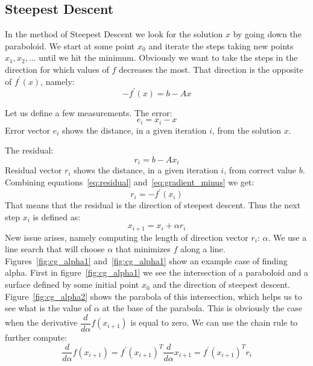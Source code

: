 \documentclass[en]{minipw} %
\begin{document}
\subsection{Steepest Descent}
In the method of Steepest Descent we look for the solution $x$ by going down the paraboloid. We start at some point $x_0$ and iterate the steps taking new points $x_1, x_2 ,...$ until we hit the minimum. Obviously we want to take the steps in the direction for which values of $f$ decreases the most. That direction is the opposite of $f^{'}(x)$, namely:
\begin{equation}
\label{eq:gradient_minus}
-f^{'}(x) = b - Ax
\end{equation}

Let us define a few measurements. The error:
\begin{equation}
e_i = x_i - x
\end{equation}
Error vector $e_i$ shows the distance, in a given iteration $i$, from the solution $x$.

The residual:
\begin{equation}
\label{eq:residual}
r_i = b - Ax_i
\end{equation}
Residual vector $r_i$ shows the distance, in a given iteration $i$, from correct value $b$.
Combining equations~\ref{eq:residual} and~\ref{eq:gradient_minus} we get:
\begin{equation}
r_i = -f^{'}(x_i)
\end{equation}
That means that the residual is the direction of steepest descent. Thus the next step $x_i$ is defined as:
\begin{equation}
x_{i+1} = x_{i} + \alpha r_{i}
\end{equation}
New issue arises, namely computing the length of direction vector $r_{i}$: $\alpha$.
We use a line search that will choose $\alpha$ that minimizes $f$ along a line. Figures~\ref{fig:cg_alpha1} and~\ref{fig:cg_alpha1} show an example case of finding alpha. First in figure~\ref{fig:cg_alpha1} we see the intersection of a paraboloid and a surface defined by some initial point $x_0$ and the direction of steepest descent. Figure~\ref{fig:cg_alpha2} shows the parabola of this intersection, which helps us to see what is the value of $\alpha$ at the base of the parabola. This is obviously the case when the derivative $\dfrac{d}{d\alpha}f(x_{i+1})$ is equal to zero. We can use the chain rule to further compute:
\begin{equation}
\dfrac{d}{d \alpha}f(x_{i+1}) = f^{'}(x_{i+1})^{T} \dfrac{d}{d \alpha} x_{i+1} = f^{'}(x_{i+1})^{T} r_i
\end{equation}
\end{document}
